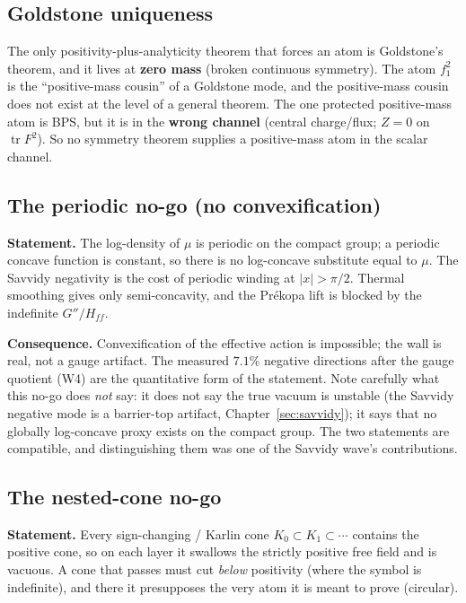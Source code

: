 \subsection{Goldstone uniqueness}

The only positivity-plus-analyticity theorem that forces an atom is Goldstone's theorem, and it
lives at \textbf{zero mass} (broken continuous symmetry). The atom $f_1^2$ is the ``positive-mass
cousin'' of a Goldstone mode, and the positive-mass cousin does not exist at the level of a
general theorem. The one protected positive-mass atom is BPS, but it is in the \textbf{wrong
channel} (central charge/flux; $Z=0$ on $\operatorname{tr}F^2$). So no symmetry theorem supplies
a positive-mass atom in the scalar channel.

\subsection{The periodic no-go (no convexification)}
\label{sec:periodic}

\textbf{Statement.} The log-density of $\mu$ is periodic on the compact group; a periodic
concave function is constant, so there is no log-concave substitute equal to $\mu$. The Savvidy
negativity is the cost of periodic winding at $|x|>\pi/2$. Thermal smoothing gives only
semi-concavity, and the Pr\'ekopa lift is blocked by the indefinite $G''/H_{ff}$.

\textbf{Consequence.} Convexification of the effective action is impossible; the wall is real,
not a gauge artifact. The measured $7.1\%$ negative directions after the gauge quotient (W4)
are the quantitative form of the statement. Note carefully what this no-go does \emph{not} say:
it does not say the true vacuum is unstable (the Savvidy negative mode is a barrier-top artifact,
Chapter~\ref{sec:savvidy}); it says that no globally log-concave proxy exists on the compact
group. The two statements are compatible, and distinguishing them was one of the Savvidy wave's
contributions.

\subsection{The nested-cone no-go}

\textbf{Statement.} Every sign-changing / Karlin cone $K_0\subset K_1\subset\cdots$ contains the
positive cone, so on each layer it swallows the strictly positive free field and is vacuous. A
cone that passes must cut \emph{below} positivity (where the symbol is indefinite), and there it
presupposes the very atom it is meant to prove (circular).

